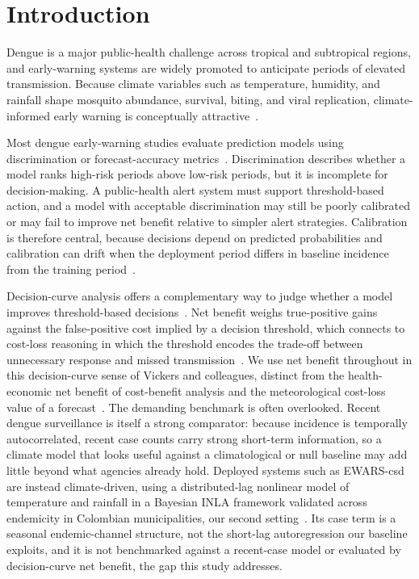 \documentclass[11pt,a4paper]{article}
\begin{document}
\section{Introduction}

Dengue is a major public-health challenge across tropical and subtropical regions, and early-warning systems are widely promoted to anticipate periods of elevated transmission. Because climate variables such as temperature, humidity, and rainfall shape mosquito abundance, survival, biting, and viral replication, climate-informed early warning is conceptually attractive~\cite{Mordecai2017,Huber2018}.

Most dengue early-warning studies evaluate prediction models using discrimination or forecast-accuracy metrics~\cite{Johansson2019,Baharom2022,HussainAlkhateeb2021,Lowe2021}. Discrimination describes whether a model ranks high-risk periods above low-risk periods, but it is incomplete for decision-making. A public-health alert system must support threshold-based action, and a model with acceptable discrimination may still be poorly calibrated or may fail to improve net benefit relative to simpler alert strategies. Calibration is therefore central, because decisions depend on predicted probabilities and calibration can drift when the deployment period differs in baseline incidence from the training period~\cite{VanCalster2019,VanCalster2023,SteyerbergVergouwe2014}.

Decision-curve analysis offers a complementary way to judge whether a model improves threshold-based decisions~\cite{Vickers2006,Vickers2016,Vickers2019}. Net benefit weighs true-positive gains against the false-positive cost implied by a decision threshold, which connects to cost-loss reasoning in which the threshold encodes the trade-off between unnecessary response and missed transmission~\cite{Murphy1985,Tozan2023}. We use net benefit throughout in this decision-curve sense of Vickers and colleagues, distinct from the health-economic net benefit of cost-benefit analysis and the meteorological cost-loss value of a forecast~\cite{Tozan2023,Murphy1985}. The demanding benchmark is often overlooked. Recent dengue surveillance is itself a strong comparator: because incidence is temporally autocorrelated, recent case counts carry strong short-term information, so a climate model that looks useful against a climatological or null baseline may add little beyond what agencies already hold. Deployed systems such as EWARS-csd are instead climate-driven, using a distributed-lag nonlinear model of temperature and rainfall in a Bayesian INLA framework validated across endemicity in Colombian municipalities, our second setting~\cite{EWARScsd}. Its case term is a seasonal endemic-channel structure, not the short-lag autoregression our baseline exploits, and it is not benchmarked against a recent-case model or evaluated by decision-curve net benefit, the gap this study addresses.
\end{document}
